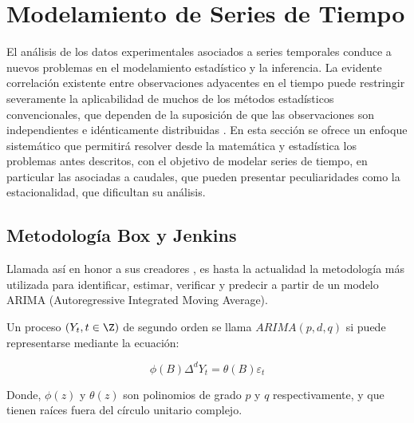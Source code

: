 \documentclass[12pt,oneside]{book}\usepackage[]{graphicx}\usepackage[]{color}
\theoremstyle{definition} %
\begin{document}

\section{Modelamiento de Series de Tiempo}

El análisis de los datos experimentales asociados a series temporales conduce a nuevos problemas en el modelamiento estadístico y la inferencia. La evidente correlación existente entre observaciones adyacentes en el tiempo puede restringir severamente la aplicabilidad de muchos de los métodos estadísticos convencionales, que dependen de la suposición de que las observaciones son independientes e idénticamente distribuidas \cite{shumway2017time}.
En esta sección se ofrece un enfoque sistemático que permitirá resolver desde la matemática y estadística los problemas antes descritos, con el objetivo de modelar series de tiempo, en particular las asociadas a caudales, que pueden presentar peculiaridades como la estacionalidad, que dificultan su análisis.
%





\subsection{Metodología Box y Jenkins}
\label{sec2box}

Llamada así en honor a sus creadores \citeauthor{box1970time}, es hasta la actualidad la metodología más utilizada para identificar, estimar, verificar y predecir a partir de un modelo ARIMA (Autoregressive Integrated Moving Average). 


\begin{definicion}
Un proceso $(Y_t, t \in \Z)$ de segundo orden se llama $ARIMA(p,d,q)$ si puede representarse mediante la ecuación:

\begin{equation}
\phi  (B) \Delta^d Y_t =  \theta  (B) \varepsilon_t\label{eq:arima_def}
\end{equation}

Donde, $\phi(z)$ y $\theta (z)$ son polinomios de grado $p$ y $q$ respectivamente, y que tienen raíces fuera del círculo unitario complejo.
\end{definicion}
\end{document}
